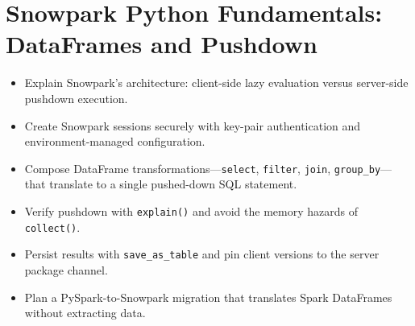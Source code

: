 \chapter{Snowpark Python Fundamentals: DataFrames and Pushdown}
%
\begin{objectives}
\begin{itemize}
    \item Explain Snowpark's architecture: client-side lazy evaluation versus server-side pushdown execution.
    \item Create Snowpark sessions securely with key-pair authentication and environment-managed configuration.
    \item Compose DataFrame transformations---\texttt{select}, \texttt{filter}, \texttt{join}, \texttt{group\_by}---that translate to a single pushed-down SQL statement.
    \item Verify pushdown with \texttt{explain()} and avoid the memory hazards of \texttt{collect()}.
    \item Persist results with \texttt{save\_as\_table} and pin client versions to the server package channel.
    \item Plan a PySpark-to-Snowpark migration that translates Spark DataFrames without extracting data.
\end{itemize}
\end{objectives}

